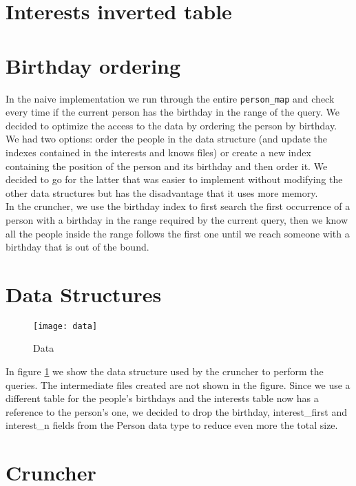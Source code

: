\section{Interests inverted table}


\section{Birthday ordering}
In the naive implementation we run through the entire \texttt{person\_map} and check every time if the current person has the birthday in the range of the query. We decided to optimize the access to the data by ordering the person by birthday. We had two options: order the people in the data structure (and update the indexes contained in the interests and knows files) or create a new index containing the position of the person and its birthday and then order it. We decided to go for the latter that was easier to implement without modifying the other data structures but has the disadvantage that it uses more memory. \\
In the cruncher, we use the birthday index to first search the first occurrence of a person with a birthday in the range required by the current query, then we know all the people inside the range follows the first one until we reach someone with a birthday that is out of the bound.

\section{Data Structures}

\begin{figure}[tbh]
\texttt{[image: data]}
\caption[Data]{Data}
\label{fig:data}
\end{figure}

In figure \ref{fig:data} we show the data structure used by the cruncher to perform the queries. The intermediate files created are not shown in the figure. Since we use a different table for the people's birthdays and the interests table now has a reference to the person's one, we decided to drop the birthday, interest\_first and interest\_n fields from the Person data type to reduce even more the total size.


\section{Cruncher}

